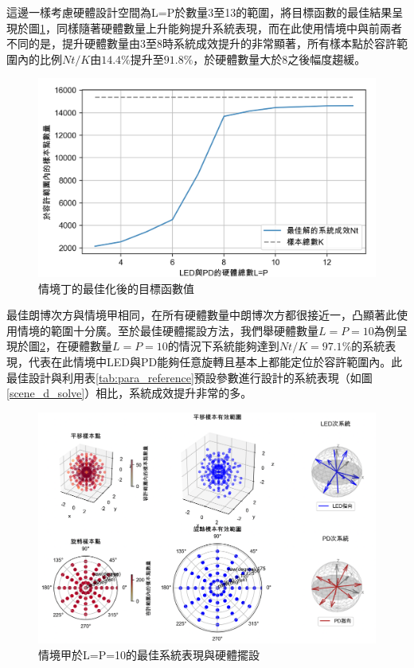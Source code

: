     這邊一樣考慮硬體設計空間為L=P於數量3至13的範圍，將目標函數的最佳結果呈現於圖\ref{pic:opt_D}，同樣隨著硬體數量上升能夠提升系統表現，而在此使用情境中與前兩者不同的是，提升硬體數量由3至8時系統成效提升的非常顯著，所有樣本點於容許範圍內的比例$Nt/K$由$14.4\%$提升至$91.8\%$，於硬體數量大於8之後幅度趨緩。

    \begin{figure}[htpb]
        \centering
        \includegraphics[width=13cm]{ch5pic/optimize_d.png}
        \caption{情境丁的最佳化後的目標函數值}
        \label{pic:opt_D}
    \end{figure}

    最佳朗博次方與情境甲相同，在所有硬體數量中朗博次方都很接近一，凸顯著此使用情境的範圍十分廣。至於最佳硬體擺設方法，我們舉硬體數量$L=P=10$為例呈現於圖\ref{pic:d_1010}，在硬體數量$L=P=10$的情況下系統能夠達到$Nt/K=97.1\%$的系統表現，代表在此情境中LED與PD能夠任意旋轉且基本上都能定位於容許範圍內。此最佳設計與利用表\ref{tab:para_reference}預設參數進行設計的系統表現（如圖\ref{scene_d_solve}）相比，系統成效提升非常的多。

    \begin{figure}[htpb]
        \centering
        \includegraphics[width=15cm]{ch5pic/d_1010.png}
        \caption{情境甲於L=P=10的最佳系統表現與硬體擺設}
        \label{pic:d_1010}
    \end{figure}

